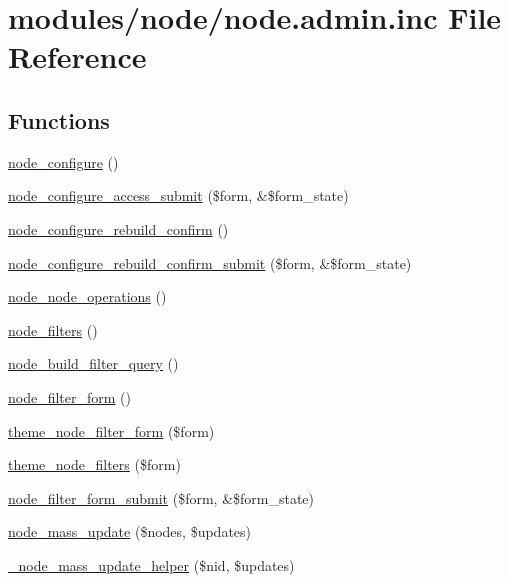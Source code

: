 \hypertarget{node_8admin_8inc}{
\section{modules/node/node.admin.inc File Reference}
\label{node_8admin_8inc}
}
\subsection*{Functions}
\begin{CompactItemize}
\item 
\hyperlink{node_8admin_8inc_166b7491e7493feafd6ae178ebcc238c}{node\_\-configure} ()
\item 
\hyperlink{node_8admin_8inc_4181047f10a38f2bc1e071e5f0b3361c}{node\_\-configure\_\-access\_\-submit} (\$form, \&\$form\_\-state)
\item 
\hyperlink{node_8admin_8inc_650b907eb478b9c293e4b93e3ecb560d}{node\_\-configure\_\-rebuild\_\-confirm} ()
\item 
\hyperlink{node_8admin_8inc_81b709fbced4062b5c58137a9255fab4}{node\_\-configure\_\-rebuild\_\-confirm\_\-submit} (\$form, \&\$form\_\-state)
\item 
\hyperlink{node_8admin_8inc_6e9cc98ef5c62744d557bf52b8531553}{node\_\-node\_\-operations} ()
\item 
\hyperlink{node_8admin_8inc_a9c4e0dc2b5e8a9ca9c855161ca02969}{node\_\-filters} ()
\item 
\hyperlink{node_8admin_8inc_f8309df77c5a2bd9fc4bbafbc57b77cb}{node\_\-build\_\-filter\_\-query} ()
\item 
\hyperlink{node_8admin_8inc_2b7edb82b488db11ffde4fa60958004d}{node\_\-filter\_\-form} ()
\item 
\hyperlink{group__themeable_gacf4ca3e12603e4d519b6313276e761e}{theme\_\-node\_\-filter\_\-form} (\$form)
\item 
\hyperlink{group__themeable_g8c9a4c2c680b412160c95515eb9b4c7b}{theme\_\-node\_\-filters} (\$form)
\item 
\hyperlink{node_8admin_8inc_346f00ebb9b4aae36025623d893c5061}{node\_\-filter\_\-form\_\-submit} (\$form, \&\$form\_\-state)
\item 
\hyperlink{node_8admin_8inc_b40a38d08f170c418b0dac544d8ba97c}{node\_\-mass\_\-update} (\$nodes, \$updates)
\item 
\hyperlink{node_8admin_8inc_664540e1e689d8cdd4850bb7cb498a09}{\_\-node\_\-mass\_\-update\_\-helper} (\$nid, \$updates)
\item 

\end{CompactItemize}
